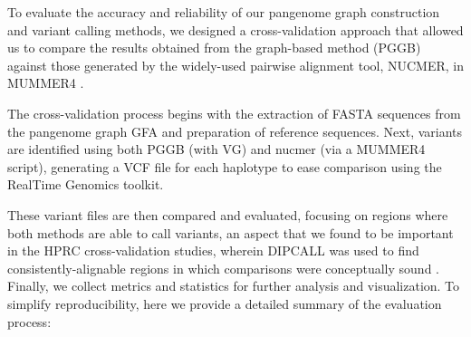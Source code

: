 \documentclass[pdflatex,mathphys]{jnl}%
\theoremstyle{thmstyleone}%
\theoremstyle{thmstyletwo}%
\theoremstyle{thmstylethree}%
\begin{document}
\begin{appendices}
To evaluate the accuracy and reliability of our pangenome graph construction and variant calling methods, we designed a cross-validation approach that allowed us to compare the results obtained from the graph-based method (PGGB) against those generated by the widely-used pairwise alignment tool, NUCMER, in MUMMER4 \cite{Marcais_2018}.

The cross-validation process begins with the extraction of FASTA sequences from the pangenome graph GFA and preparation of reference sequences.
Next, variants are identified using both PGGB (with VG) and nucmer (via a MUMMER4 script), generating a VCF file for each haplotype to ease comparison using the RealTime Genomics toolkit.

These variant files are then compared and evaluated, focusing on regions where both methods are able to call variants, an aspect that we found to be important in the HPRC cross-validation studies, wherein DIPCALL was used to find consistently-alignable regions in which comparisons were conceptually sound \cite{Liao_2023}.
Finally, we collect metrics and statistics for further analysis and visualization.
To simplify reproducibility, here we provide a detailed summary of the evaluation process:


\end{appendices}
\end{document}
